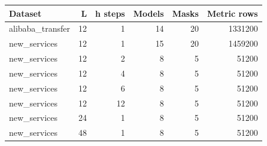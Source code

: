 \begin{tabular}{lrrrrr}
\toprule
Dataset & L & h steps & Models & Masks & Metric rows \\
\midrule
alibaba\_transfer & 12 & 1 & 14 & 20 & 1331200 \\
new\_services & 12 & 1 & 15 & 20 & 1459200 \\
new\_services & 12 & 2 & 8 & 5 & 51200 \\
new\_services & 12 & 4 & 8 & 5 & 51200 \\
new\_services & 12 & 6 & 8 & 5 & 51200 \\
new\_services & 12 & 12 & 8 & 5 & 51200 \\
new\_services & 24 & 1 & 8 & 5 & 51200 \\
new\_services & 48 & 1 & 8 & 5 & 51200 \\
\bottomrule
\end{tabular}
